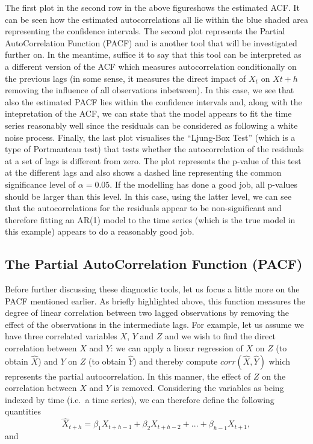\documentclass[]{book}
\theoremstyle{definition}
\theoremstyle{definition}
\theoremstyle{definition}
\theoremstyle{remark}
\begin{document}
The first plot in the second row in the above figureshows the estimated
ACF. It can be seen how the estimated autocorrelations all lie within
the blue shaded area representing the confidence intervals. The second
plot represents the Partial AutoCorrelation Function (PACF) and is
another tool that will be investigated further on. In the meantime,
suffice it to say that this tool can be interpreted as a different
version of the ACF which measures autocorrelation conditionally on the
previous lags (in some sense, it measures the direct impact of \(X_t\)
on \(X{t+h}\) removing the influence of all observations inbetween). In
this case, we see that also the estimated PACF lies within the
confidence intervals and, along with the intepretation of the ACF, we
can state that the model appears to fit the time series reasonably well
since the residuals can be considered as following a white noise
process. Finally, the last plot visualises the ``Ljung-Box Test'' (which
is a type of Portmanteau test) that tests whether the autocorrelation of
the residuals at a set of lags is different from zero. The plot
represents the p-value of this test at the different lags and also shows
a dashed line representing the common significance level of
\(\alpha = 0.05\). If the modelling has done a good job, all p-values
should be larger than this level. In this case, using the latter level,
we can see that the autocorrelations for the residuals appear to be
non-significant and therefore fitting an AR(1) model to the time series
(which is the true model in this example) appears to do a reasonably
good job.

\subsection{The Partial AutoCorrelation Function
(PACF)}\label{the-partial-autocorrelation-function-pacf}

Before further discussing these diagnostic tools, let us focus a little
more on the PACF mentioned earlier. As briefly highlighted above, this
function measures the degree of linear correlation between two lagged
observations by removing the effect of the observations in the
intermediate lags. For example, let us assume we have three correlated
variables \(X\), \(Y\) and \(Z\) and we wish to find the direct
correlation between \(X\) and \(Y\): we can apply a linear regression of
\(X\) on \(Z\) (to obtain \(\hat{X}\)) and \(Y\) on \(Z\) (to obtain
\(\hat{Y}\)) and thereby compute \(corr(\hat{X}, \hat{Y})\) which
represents the partial autocorrelation. In this manner, the effect of
\(Z\) on the correlation between \(X\) and \(Y\) is removed. Considering
the variables as being indexed by time (i.e.~a time series), we can
therefore define the following quantities
\[\hat{X}_{t+h} = \beta_1 X_{t+h-1} + \beta_2 X_{t+h-2} + ... + \beta_{h-1} X_{t+1},\]
and
\end{document}
